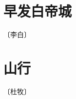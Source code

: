 \documentclass[12pt,UTF-8,openany]{ctexbook}
\begin{document}
\vspace{8pt}


\section{早发白帝城}

\begin{center}
    \vspace{10pt}
    
    \begin{normalsize}
        
        〔李白〕
        
    \end{normalsize}
    
    \vspace{8pt}
    
    \begin{large}
        
        
        
    \end{large}
    
\end{center}

\vspace{8pt}


\section{山行}

\begin{center}
    \vspace{10pt}
    
    \begin{normalsize}
        
        〔杜牧〕
        
    \end{normalsize}
    
    \vspace{8pt}
    
    \begin{large}
        
        
        
    \end{large}
    
\end{center}
\end{document}
